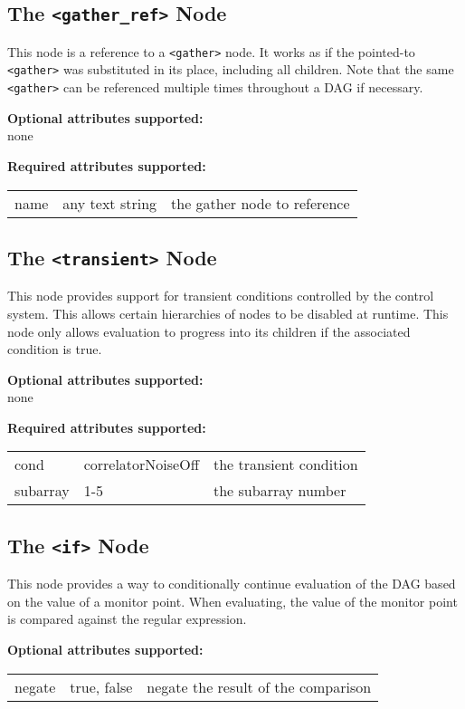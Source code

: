 \documentclass[letterpaper,12pt,oneside,pdftex]{article}
\newcommand{\optattrs}{\textbf{Optional attributes supported:}}
\newcommand{\reqattrs}{\textbf{Required attributes supported:}}
\begin{document}
\subsection{The \texttt{<gather\_ref>} Node}

This node is a reference to a \verb|<gather>| node. It works as if the
pointed-to \verb|<gather>| was substituted in its place, including all children.
Note that the same \verb|<gather>| can be referenced multiple times throughout a
DAG if necessary.

\optattrs \\
none

\reqattrs \\
\begin{tabular}{lll}
name        & any text string   & the gather node to reference \\
\end{tabular}

\subsection{The \texttt{<transient>} Node}

This node provides support for transient conditions controlled by the control
system. This allows certain hierarchies of nodes to be disabled at runtime.
This node only allows evaluation to progress into its children if the associated
condition is true.

\optattrs \\
none

\reqattrs \\
\begin{tabular}{lll}
cond        & correlatorNoiseOff & the transient condition \\
subarray    & 1-5                & the subarray number \\
\end{tabular}

\subsection{The \texttt{<if>} Node}

This node provides a way to conditionally continue evaluation of the DAG based
on the value of a monitor point. When evaluating, the value of the monitor point
is compared against the regular expression.

\optattrs \\
\begin{tabular}{lll}
negate      & true, false   & negate the result of the comparison \\
\end{tabular}
\end{document}
